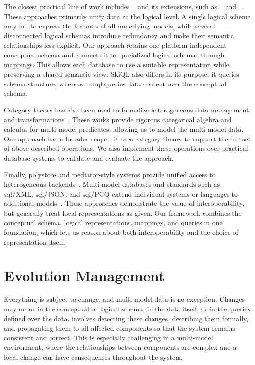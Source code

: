 The closest practical line of work includes ~\citep{DBLP:journals/is/CandelRM22} and its extensions, such as ~\citep{DBLP:conf/er/ChillonRM21a, 10.1109/TKDE.2024.3362273} and ~\citep{skiql}. These approaches primarily unify data at the logical level. A single logical schema may fail to express the features of all underlying models, while several disconnected logical schemas introduce redundancy and make their semantic relationships less explicit. Our approach retains one platform-independent conceptual schema and connects it to specialized logical schemas through mappings. This allows each database to use a suitable representation while preserving a shared semantic view. SkiQL also differs in its purpose: it queries schema structure, whereas \acrshort{mmql} queries data content over the conceptual schema.

Category theory has also been used to formalize heterogeneous data management and transformations~\citep{DBLP:journals/corr/abs-2201-04905, lu2025part1, lu2025part2}. These works provide rigorous categorical algebra and calculus for multi-model predicates, allowing us to model the multi-model data. Our approach has a broader scope---it uses category theory to support the full set of above-described operations. We also implement these operations over practical database systems to validate and evaluate the approach.

Finally, polystore and mediator-style systems provide unified access to heterogeneous backends~\citep{conf/cikm/LuHC18, DBLP:journals/ijcc/BondiombouyV16, alotaibi2020estocada}. Multi-model databases and standards such as \acrshort{sql}/XML, \acrshort{sql}/JSON, and \acrshort{sql}/PGQ extend individual systems or languages to additional models~\citep{Jiaheng2023Survey, SQLXML, SQLJSON, SQLPGQ}. These approaches demonstrate the value of interoperability, but generally treat local representations as given. Our framework combines the conceptual schema, logical representations, mappings, and queries in one foundation, which lets us reason about both interoperability and the choice of representation itself.


\section{Evolution Management}

Everything is subject to change, and multi-model data is no exception. Changes may occur in the conceptual or logical schema, in the data itself, or in the queries defined over the data.  involves detecting these changes, describing them formally, and propagating them to all affected components so that the system remains consistent and correct. This is especially challenging in a multi-model environment, where the relationships between components are complex and a local change can have consequences throughout the system.

